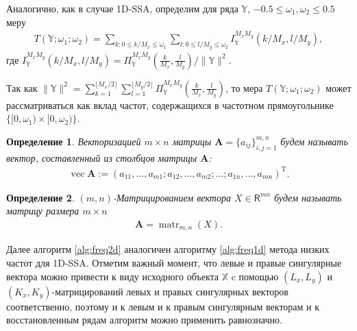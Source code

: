 \documentclass[specialist,
               substylefile = spbu.rtx,
               subf,href,colorlinks=true, 12pt]{disser}
\def\vec{\mathop{\mathrm{vec}}}
\def\matr{\mathop{\mathrm{matr}}}
\newtheorem{defn}{Определение}
\begin{document}
Аналогично, как в случае 1D-SSA, определим для ряда $\mathbb{Y}$, $-0.5 \leqslant \omega_{1},  \omega_{2} \leqslant 0.5$ меру
\begin{gather}
\label{eq:T_measure_2d}
T(\mathbb{Y}; \omega_{1}; \omega_{2}) = \sum_{k: 0 \leqslant k/M_x \leqslant \omega_{1}} \sum_{l: 0 \leqslant l/M_y \leqslant \omega_{2}}  I_\mathbb{Y}^{M_x M_y}(k/M_x, l/M_y),
\end{gather}
где $I_\mathbb{Y}^{M_x M_y}(k/M_x, l/M_y) =\Pi_\mathbb{Y}^{M_x M_y} \left(\frac{k}{M_x}, \frac{l}{M_y}\right) / \|\mathbb{Y}\|^2$.

Так как $\|\mathbb{Y}\|^2  =  \sum_{k=1}^{\lfloor M_x/2 \rfloor}  \sum_{l=1}^{\lfloor M_y/2 \rfloor}  \Pi_{\mathbb{Y}}^{M_x M_y} \left(\frac{k}{M_x}, \frac{l}{M_y}\right)$, то мера $T(\mathbb{Y}; \omega_{1}; \omega_{2}) $ может рассматриваться как вклад частот, содержащихся в частотном прямоугольнике $\{[0, \omega_{1}) \times [0, \omega_{2}) \}$.

\begin{defn}
Векторизацией $m \times n$ матрицы $\mathbf{A} = \{a_{ij}\}_{i,j=1}^{m,n}$ будем называть вектор, составленный из столбцов матрицы $\mathbf{A}$:
\begin{gather*}
\vec \mathbf{A} := (a_{11}, \ldots, a_{m1}; a_{12}, \ldots, a_{m2}; \ldots;  a_{1n}, \ldots, a_{mn})^{\mathrm{T}}.
\end{gather*}
\end{defn}

\begin{defn}
 $(m,n)$-Матрицированием вектора $X \in \mathsf{R}^{mn}$ будем называть матрицу размера $m \times n$
\begin{gather*}
 \mathbf{A} = \matr_{m,n} (X).
\end{gather*}
\end{defn}

Далее алгоритм \ref{alg:freq2d} аналогичен алгоритму \ref{alg:freq1d} метода низких частот для 1D-SSA.
Отметим важный момент, что левые и правые сингулярные вектора можно привести к виду исходного объекта $\mathbb{X}$ c помощью $(L_x, L_y)$ и $(K_x, K_y)$-матрицирований левых и правых сингулярных векторов соответственно, поэтому и к левым и к правым сингулярным векторам и к восстановленным рядам алгоритм можно применить равнозначно. 
\end{document}
